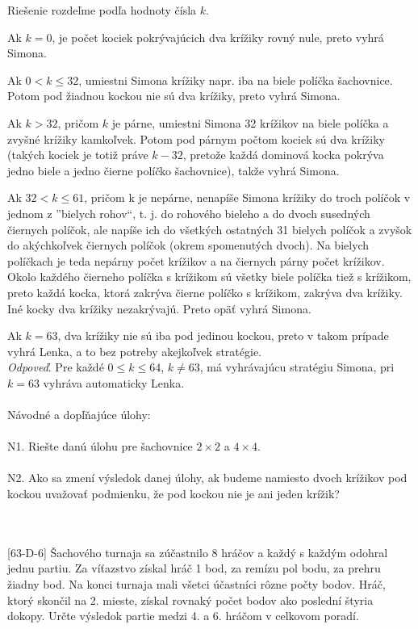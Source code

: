 \rieh Riešenie rozdeľme podľa hodnoty čísla $k$.

Ak $k = 0$, je počet kociek pokrývajúcich dva krížiky rovný nule, preto vyhrá Simona.

Ak $0 < k \leq 32$, umiestni Simona krížiky napr. iba na biele políčka šachovnice. Potom pod žiadnou kockou nie sú dva krížiky, preto vyhrá Simona.

Ak $k > 32$, pričom $k$ je párne, umiestni Simona 32 krížikov na biele políčka a zvyšné krížiky kamkoľvek. Potom pod párnym počtom kociek sú dva krížiky (takých kociek je totiž práve $k - 32$, pretože každá dominová kocka pokrýva jedno biele a jedno čierne
políčko šachovnice), takže vyhrá Simona.

Ak $32 < k \leq 61$, pričom k je nepárne, nenapíše Simona krížiky do troch políčok v jednom z ”bielych rohov“, t. j. do rohového bieleho a do dvoch susedných čiernych políčok, ale napíše ich do všetkých ostatných 31 bielych políčok a zvyšok do akýchkoľvek čiernych políčok (okrem spomenutých dvoch). Na bielych políčkach je teda nepárny počet krížikov a na čiernych párny počet krížikov. Okolo každého čierneho políčka s krížikom sú všetky biele políčka tiež s krížikom, preto každá kocka, ktorá zakrýva čierne políčko s krížikom, zakrýva dva krížiky. Iné kocky dva krížiky nezakrývajú. Preto opäť vyhrá Simona.

Ak $k = 63$, dva krížiky nie sú iba pod jedinou kockou, preto v takom prípade vyhrá Lenka, a to bez potreby akejkoľvek stratégie.\\
\textit{Odpoveď}. Pre každé $0 \leq k \leq 64$, $k \neq 63$, má vyhrávajúcu stratégiu Simona, pri $k = 63$ vyhráva automaticky Lenka.\\
\\
Návodné a dopľňajúce úlohy:\\
\\
N1. Riešte danú úlohu pre šachovnice $2 \times 2$ a $4 \times 4$.\\
\\
N2. Ako sa zmení výsledok danej úlohy, ak budeme namiesto dvoch krížikov pod kockou uvažovať podmienku, že pod kockou nie je ani jeden krížik?\\
\\

\\

\begin{tcolorbox}[breakable,notitle,boxrule=0pt,colback=light-gray,colframe=light-gray]\ul [63-D-6]
Šachového turnaja sa zúčastnilo 8 hráčov a každý s každým odohral jednu partiu. Za víťazstvo získal hráč 1 bod, za remízu pol bodu, za prehru žiadny bod. Na konci turnaja mali všetci účastníci rôzne počty bodov. Hráč, ktorý skončil na 2. mieste, získal rovnaký počet bodov ako poslední štyria dokopy. Určte výsledok partie medzi 4. a 6. hráčom v celkovom poradí.

\end{tcolorbox}

